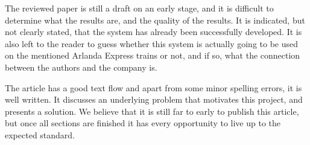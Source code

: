 \documentclass[a4paper,10pt]{article}
\begin{document}
The reviewed paper is still a draft on an early stage, and it is difficult to determine what the results are, and the quality of the results. It is indicated, but not clearly stated, that the system has already been successfully developed. It is also left to the reader to guess whether this system is actually going to be used on the mentioned Arlanda Express trains or not, and if so, what the connection between the authors and the company is.

The article has a good text flow and apart from some minor spelling errors, it is well written. It discusses an underlying problem that motivates this project, and presents a solution. We believe that it is still far to early to publish this article, but once all sections are finished it has every opportunity to live up to the expected standard.
\end{document}

